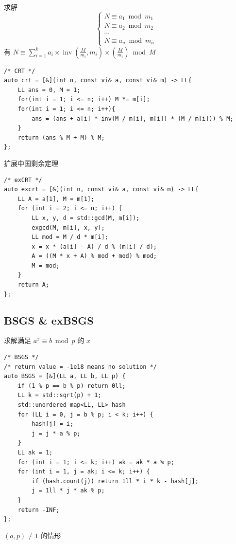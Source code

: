 \documentclass[UTF8, a4paper, titlepage, twoside]{ctexart}
\begin{document}
求解
$$
    \left\{\begin{array}{ll}N \equiv a_{1} \bmod m_{1} \\ N \equiv a_{2} \bmod m_{2} \\  \cdots \\ N \equiv a_{n} \bmod m_{n}\end{array}\right.
$$
有 $N \equiv \sum\limits_{i=1}^{k} a_{i} \times \operatorname{inv}\left(\frac{M}{m_{i}}, m_{i}\right) \times\left(\frac{M}{m_{i}}\right)\bmod M$

\begin{lstlisting}[style=cpp]
/* CRT */
auto crt = [&](int n, const vi& a, const vi& m) -> LL{
    LL ans = 0, M = 1;
    for(int i = 1; i <= n; i++) M *= m[i];
    for(int i = 1; i <= n; i++){
        ans = (ans + a[i] * inv(M / m[i], m[i]) * (M / m[i])) % M;
    }
    return (ans % M + M) % M;
};
\end{lstlisting}

扩展中国剩余定理

\begin{lstlisting}[style=cpp]
/* exCRT */
auto excrt = [&](int n, const vi& a, const vi& m) -> LL{
    LL A = a[1], M = m[1];
    for (int i = 2; i <= n; i++) {
        LL x, y, d = std::gcd(M, m[i]);
        exgcd(M, m[i], x, y);
        LL mod = M / d * m[i];
        x = x * (a[i] - A) / d % (m[i] / d); 
        A = ((M * x + A) % mod + mod) % mod;
        M = mod;
    }
    return A;
};
\end{lstlisting}

\subsection{ BSGS \& exBSGS }

求解满足 $a ^ x \equiv b \bmod p$ 的 $x$

\begin{lstlisting}[style=cpp]
/* BSGS */
/* return value = -1e18 means no solution */
auto BSGS = [&](LL a, LL b, LL p) {
    if (1 % p == b % p) return 0ll;
    LL k = std::sqrt(p) + 1;
    std::unordered_map<LL, LL> hash
    for (LL i = 0, j = b % p; i < k; i++) {
        hash[j] = i;
        j = j * a % p;
    }
    LL ak = 1;
    for (int i = 1; i <= k; i++) ak = ak * a % p;
    for (int i = 1, j = ak; i <= k; i++) {
        if (hash.count(j)) return 1ll * i * k - hash[j];
        j = 1ll * j * ak % p;
    }
    return -INF;
};
\end{lstlisting}

$(a, p) \neq 1$ 的情形
\end{document}
